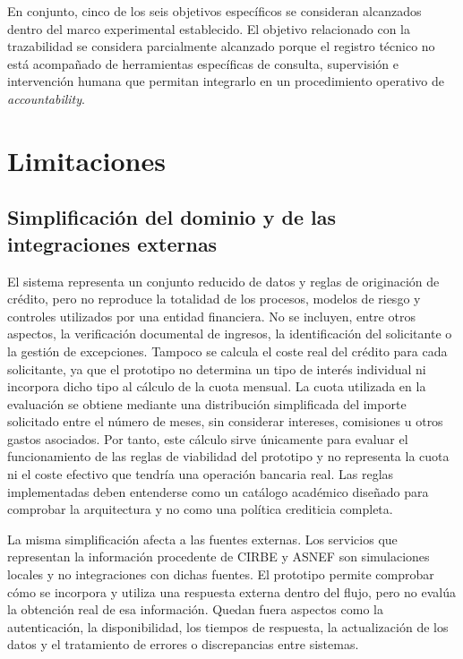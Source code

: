 \documentclass[12pt,a4paper]{report}
\begin{document}
En conjunto, cinco de los seis objetivos específicos se consideran alcanzados dentro del marco experimental establecido. El objetivo relacionado con la trazabilidad se considera parcialmente alcanzado porque el registro técnico no está acompañado de herramientas específicas de consulta, supervisión e intervención humana que permitan integrarlo en un procedimiento operativo de \textit{accountability}.

\section{Limitaciones}

\subsection{Simplificación del dominio y de las integraciones externas}

El sistema representa un conjunto reducido de datos y reglas de originación de crédito, pero no reproduce la totalidad de los procesos, modelos de riesgo y controles utilizados por una entidad financiera. No se incluyen, entre otros aspectos, la verificación documental de ingresos, la identificación del solicitante o la gestión de excepciones. Tampoco se calcula el coste real del crédito para cada solicitante, ya que el prototipo no determina un tipo de interés individual ni incorpora dicho tipo al cálculo de la cuota mensual. La cuota utilizada en la evaluación se obtiene mediante una distribución simplificada del importe solicitado entre el número de meses, sin considerar intereses, comisiones u otros gastos asociados. Por tanto, este cálculo sirve únicamente para evaluar el funcionamiento de las reglas de viabilidad del prototipo y no representa la cuota ni el coste efectivo que tendría una operación bancaria real. Las reglas implementadas deben entenderse como un catálogo académico diseñado para comprobar la arquitectura y no como una política crediticia completa.

La misma simplificación afecta a las fuentes externas. Los servicios que representan la información procedente de CIRBE y ASNEF son simulaciones locales y no integraciones con dichas fuentes. El prototipo permite comprobar cómo se incorpora y utiliza una respuesta externa dentro del flujo, pero no evalúa la obtención real de esa información. Quedan fuera aspectos como la autenticación, la disponibilidad, los tiempos de respuesta, la actualización de los datos y el tratamiento de errores o discrepancias entre sistemas.
\end{document}

